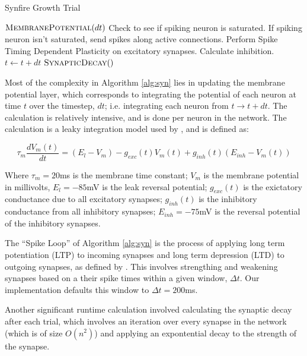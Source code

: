 \documentclass[a4paper]{article}
\begin{document}
\begin{algorithm}[H]
\caption{Synfire Growth Trial}
\label{alg:syn}
\begin{algorithmic}
	\State $\textsc{MembranePotential}(dt)$
		\State Check to see if spiking neuron is saturated.
		\State If spiking neuron isn't saturated, send spikes along active connections.
		\State Perform Spike Timing Dependent Plasticity on excitatory synapses.
	\EndFor
		\State Calculate inhibition.
	\EndFor
	\State $t \gets t + dt$
\EndWhile
\State $\textsc{SynapticDecay}()$
\end{algorithmic}
\end{algorithm}

Most of the complexity in Algorithm \ref{alg:syn} lies in updating the membrane potential layer, which corresponds to integrating the potential of each neuron at time $t$ over the timestep, $dt$; i.e. integrating each neuron from $t \rightarrow t + dt$. The calculation is relatively intensive, and is done per neuron in the network. The calculation is a leaky integration model used by \cite{synfire}, and is defined as:

$$\tau_m\frac{dV_m(t)}{dt} = (E_l - V_m) - g_{exc}(t)V_m(t)+g_{inh}(t)(E_{inh}-V_m(t))$$

Where $\tau_m = 20$ms is the membrane time constant; $V_m$ is the membrane potential in millivolts, $E_l = -85$mV is the leak reversal potential; $g_{exc}(t)$ is the exictatory conductance due to all excitatory synapses; $g_{inh}(t)$ is the inhibitory conductance from all inhibitory synapses; $E_{inh} = -75$mV is the reversal potential of the inhibitory synapses. 

The ``Spike Loop'' of Algorithm \ref{alg:syn} is the process of applying long term potentiation (LTP) to incoming synapses and long term depression (LTD) to outgoing synapses, as defined by \cite{synfire}. This involves strengthing and weakening synapses based on a their spike times within a given window, $\Delta t$. Our implementation defaults this window to $\Delta t = 200$ms.

Another significant runtime calculation involved calculating the synaptic decay after each trial, which involves an iteration over every synapse in the network (which is of size $O(n^2)$) and applying an expontential decay to the strength of the synapse.
\end{document}
